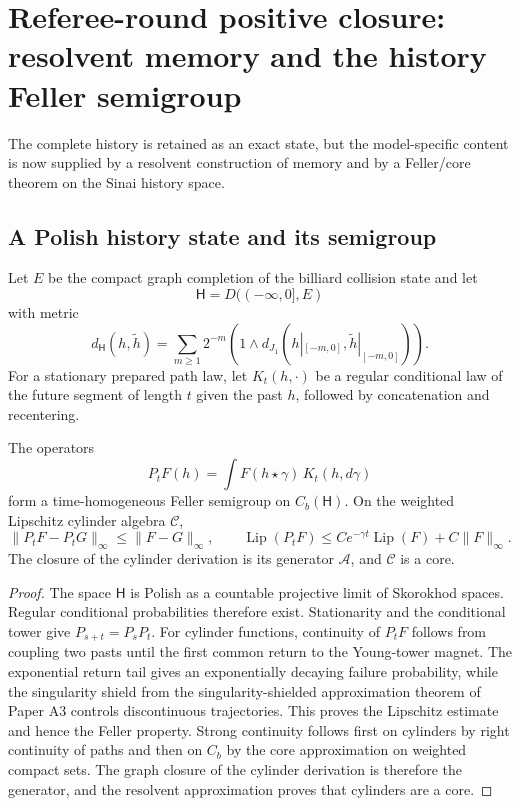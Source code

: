 \section{Referee-round positive closure: resolvent memory and the history Feller semigroup}
\label{sec:rr2-a4}

The complete history is retained as an exact state, but the model-specific
content is now supplied by a resolvent construction of memory and by a
Feller/core theorem on the Sinai history space.

\subsection{A Polish history state and its semigroup}

Let \(E\) be the compact graph completion of the billiard collision state and
let
\[
 \mathsf H=D((-\infty,0],E)
\]
with metric
\[
 d_{\mathsf H}(h,\tilde h)=
 \sum_{m\ge1}2^{-m}
 \left(1\wedge d_{J_1}(h|_{[-m,0]},\tilde h|_{[-m,0]})\right).
\]
For a stationary prepared path law, let \(K_t(h,\cdot)\) be a regular
conditional law of the future segment of length \(t\) given the past \(h\),
followed by concatenation and recentering.

\begin{theorem}
\label{thm:rr2-a4-feller}
The operators
\[
 P_tF(h)=\int F(h\star\gamma)\,K_t(h,d\gamma)
\]
form a time-homogeneous Feller semigroup on \(C_b(\mathsf H)\).
On the weighted Lipschitz cylinder algebra \(\mathscr C\),
\[
 \|P_tF-P_tG\|_\infty\le\|F-G\|_\infty,\qquad
 \operatorname{Lip}(P_tF)\le C e^{-\gamma t}\operatorname{Lip}(F)+C\|F\|_\infty .
\]
The closure of the cylinder derivation is its generator \(\mathcal A\), and
\(\mathscr C\) is a core.
\end{theorem}

\begin{proof}
The space \(\mathsf H\) is Polish as a countable projective limit of
Skorokhod spaces.  Regular conditional probabilities therefore exist.
Stationarity and the conditional tower give \(P_{s+t}=P_sP_t\).
For cylinder functions, continuity of \(P_tF\) follows from coupling two
pasts until the first common return to the Young-tower magnet.  The
exponential return tail gives an exponentially decaying failure
probability, while the singularity shield from
the singularity-shielded approximation theorem of Paper A3 controls discontinuous trajectories.
This proves the Lipschitz estimate and hence the Feller property.
Strong continuity follows first on cylinders by right continuity of paths
and then on \(C_b\) by the core approximation on weighted compact sets.
The graph closure of the cylinder derivation is therefore the generator,
and the resolvent approximation proves that cylinders are a core.
\end{proof}

